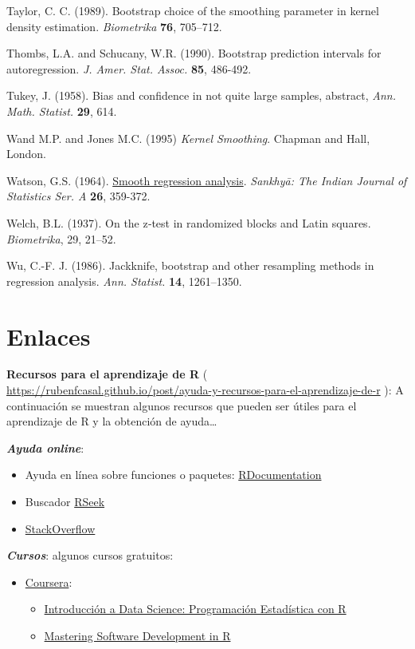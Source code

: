 \documentclass[
]{book}
\theoremstyle{break}
\theoremstyle{definition}
\theoremstyle{definition}
\theoremstyle{definition}
\theoremstyle{definition}
\theoremstyle{remark}
\begin{document}
Taylor, C. C. (1989). Bootstrap choice of the smoothing parameter in
kernel density estimation. \emph{Biometrika} \textbf{76}, 705--712.

Thombs, L.A. and Schucany, W.R. (1990). Bootstrap prediction intervals
for autoregression. \emph{J. Amer. Stat. Assoc.} \textbf{85}, 486-492.

Tukey, J. (1958). Bias and confidence in not quite large samples,
abstract, \emph{Ann. Math. Statist.} \textbf{29}, 614.

Wand M.P. and Jones M.C. (1995) \emph{Kernel Smoothing}. Chapman and Hall, London.

Watson, G.S. (1964). \href{https://www.jstor.org/stable/25049340?seq=1\#page_scan_tab_contents}{Smooth regression analysis}. \emph{Sankhy{ā}: The Indian Journal of Statistics Ser. A}
\textbf{26}, 359-372.

Welch, B.L. (1937). On the z‐test in randomized blocks and Latin squares. \emph{Biometrika}, 29, 21--52.

Wu, C.-F. J. (1986). Jackknife, bootstrap and other resampling methods
in regression analysis. \emph{Ann. Statist.} \textbf{14}, 1261--1350.

\hypertarget{appendix-apendices}{%
\appendix}


\hypertarget{links}{%
\chapter{Enlaces}\label{links}}

\textbf{Recursos para el aprendizaje de R} ( \url{https://rubenfcasal.github.io/post/ayuda-y-recursos-para-el-aprendizaje-de-r}
): A continuación se muestran algunos recursos que pueden ser útiles para el aprendizaje de R y la obtención de ayuda\ldots{}

\textbf{\emph{Ayuda online}}:

\begin{itemize}
\item
  Ayuda en línea sobre funciones o paquetes: \href{https://www.rdocumentation.org/}{RDocumentation}
\item
  Buscador \href{http://rseek.org/}{RSeek}
\item
  \href{http://stackoverflow.com/questions/tagged/r}{StackOverflow}
\end{itemize}

\textbf{\emph{Cursos}}:
algunos cursos gratuitos:

\begin{itemize}
\item
  \href{https://www.coursera.org/}{Coursera}:

  \begin{itemize}
  \item
    \href{https://www.coursera.org/learn/intro-data-science-programacion-estadistica-r}{Introducción a Data Science: Programación Estadística con R}
  \item
    \href{https://www.coursera.org/specializations/r}{Mastering Software Development in R}
  \end{itemize}
\end{itemize}
\end{document}
